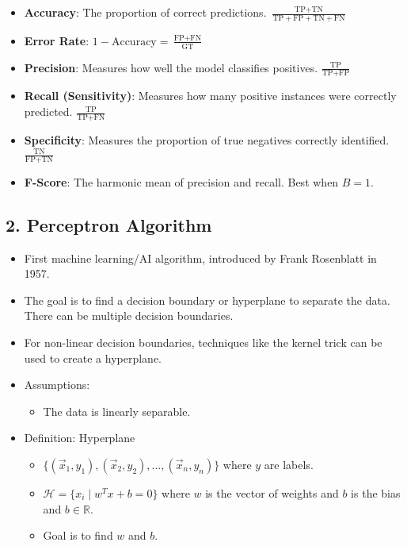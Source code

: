 \begin{itemize}
    \item \textbf{Accuracy}: The proportion of correct predictions. \(\frac{\text{TP} + \text{TN}}{\text{TP} + \text{FP} + \text{TN} + \text{FN}}\)
    \item \textbf{Error Rate}: \(1 - \text{Accuracy} = \frac{\text{FP} + \text{FN}}{\text{GT}}\)
    \item \textbf{Precision}: Measures how well the model classifies positives. \(\frac{\text{TP}}{\text{TP} + \text{FP}}\)
    \item \textbf{Recall (Sensitivity)}: Measures how many positive instances were correctly predicted. \(\frac{\text{TP}}{\text{TP} + \text{FN}}\)
    \item \textbf{Specificity}: Measures the proportion of true negatives correctly identified. \(\frac{\text{TN}}{\text{FP} + \text{TN}}\)
    \item \textbf{F-Score}: The harmonic mean of precision and recall. Best when \(B = 1\).
\end{itemize}

\subsection*{2. Perceptron Algorithm}
\begin{itemize}
    \item First machine learning/AI algorithm, introduced by Frank Rosenblatt in 1957.
    \item The goal is to find a decision boundary or hyperplane to separate the data. There can be multiple decision boundaries.
    \item For non-linear decision boundaries, techniques like the kernel trick can be used to create a hyperplane.
    \item Assumptions:
    \begin{itemize}
        \item The data is linearly separable.
    \end{itemize}
    \item Definition: Hyperplane
    \begin{itemize}
        \item $\{(\vec{x}_1,y_1),(\vec{x}_2,y_2),...,(\vec{x}_n,y_n)\}$ where $y$ are labels.
        \item $\mathcal{H}=\{x_i\mid w^Tx+b=0\}$ where $w$ is the vector of weights and $b$ is the bias and $b\in\mathbb{R}$.
        \item Goal is to find $w$ and $b$.
    \end{itemize}
\end{itemize}